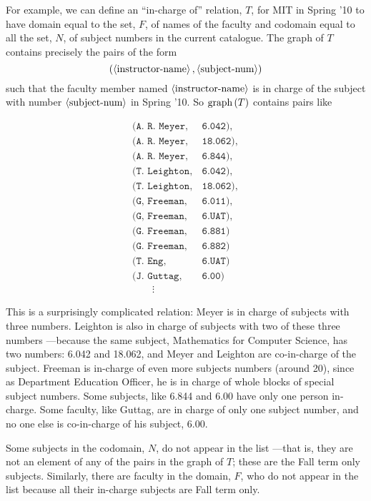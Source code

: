 For example, we can define an ``in-charge of'' relation, $T$, for MIT in
Spring '10 to have domain equal to the set, $F$, of names of the faculty
and codomain equal to all the set, $N$, of subject numbers in the current
catalogue.  The graph of $T$ contains precisely the pairs of the form
\[
(\left\langle\text{instructor-name}\right\rangle, \left\langle\text{subject-num}\right\rangle)
\]
such that the faculty member named $\left\langle\text{instructor-name}\right\rangle$ is
in charge of the subject with number $\left\langle\text{subject-num}\right\rangle$ in Spring '10.
So $\mathop{\textup{graph}}\nolimits\left(T\right)$ contains pairs like

\[\begin{array}{ll}
(\texttt{A. R. Meyer}, & \texttt{6.042}),\\
(\texttt{A. R. Meyer}, & \texttt{18.062}),\\
(\texttt{A. R. Meyer}, & \texttt{6.844}),\\
(\texttt{T. Leighton}, & \texttt{6.042}),\\
(\texttt{T. Leighton}, & \texttt{18.062}),\\
(\texttt{G, Freeman}, & \texttt{6.011}),\\
(\texttt{G, Freeman}, & \texttt{6.UAT}),\\
(\texttt{G. Freeman}, & \texttt{6.881})\\
(\texttt{G. Freeman}, & \texttt{6.882})\\
(\texttt{T. Eng},      & \texttt{6.UAT})\\
(\texttt{J. Guttag},  & \texttt{6.00})\\
\qquad \vdots
\end{array}\]

This is a surprisingly complicated relation: Meyer is in charge of
subjects with three numbers.  Leighton is also in charge of subjects with
two of these three numbers ---because the same subject, Mathematics for
Computer Science, has two numbers: 6.042 and 18.062, and Meyer and
Leighton are co-in-charge of the subject.  Freeman is in-charge of even
more subjects numbers (around 20), since as Department Education Officer,
he is in charge of whole blocks of special subject numbers.  Some
subjects, like 6.844 and 6.00 have only one person in-charge.  Some
faculty, like Guttag, are in charge of only one subject number, and no one
else is co-in-charge of his subject, 6.00.

Some subjects in the codomain, $N$, do not appear in the list ---that is,
they are not an element of any of the pairs in the graph of $T$; these are
the Fall term only subjects.  Similarly, there are faculty in the domain,
$F$, who do not appear in the list because all their in-charge subjects
are Fall term only.

